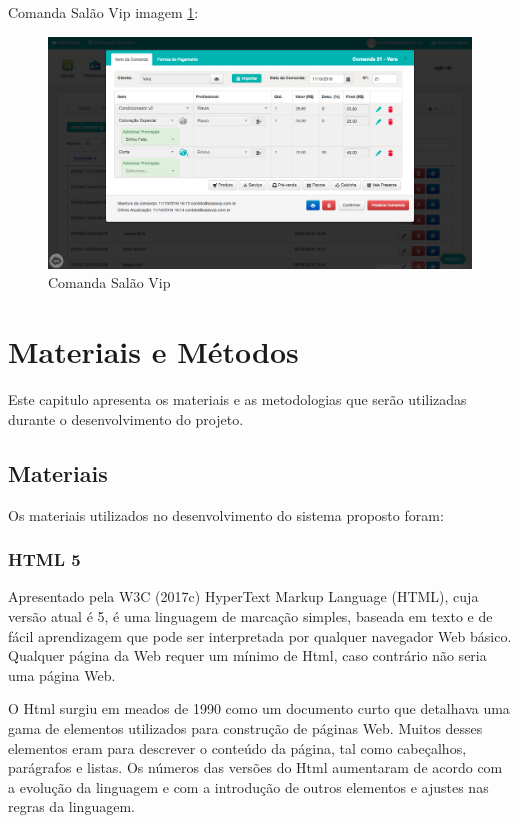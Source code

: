 \documentclass{automatextcc}
\begin{document}
   Comanda Salão Vip imagem \ref{img7}: 
 \begin{figure}[h!]
    \centering
	\includegraphics[scale=0.24]{comandaVip}
	\caption{Comanda Salão Vip}
	\label{img7}
\end{figure}

\chapter{Materiais e Métodos}

Este capitulo apresenta os materiais e as metodologias que serão utilizadas durante o desenvolvimento do projeto.

\section{Materiais}
    
Os materiais utilizados no desenvolvimento do sistema proposto foram:

\subsection{HTML 5}

Apresentado pela W3C (2017c) HyperText Markup Language (HTML), cuja versão atual é 5, é uma linguagem de marcação simples, baseada em texto e de fácil aprendizagem que pode ser interpretada por qualquer navegador Web básico. Qualquer página da Web requer um mínimo de Html, caso contrário não seria uma página Web. 

O Html surgiu em meados de 1990 como um documento curto que detalhava uma gama de elementos utilizados para construção de páginas Web. Muitos desses elementos eram para descrever o conteúdo da página, tal como cabeçalhos, parágrafos e listas. Os números das versões do Html aumentaram de acordo com a evolução da linguagem e com a introdução de outros elementos e ajustes nas regras da linguagem. 
\end{document}
